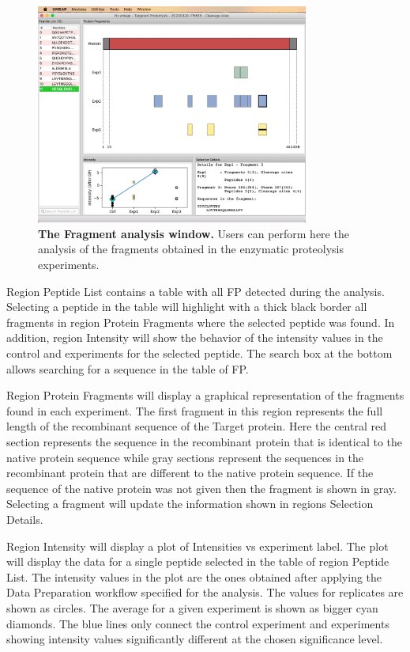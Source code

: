 \begin{figure}[h]
    \centering
    \includegraphics[width=0.8\textwidth]{./IMAGES/MOD-TARPROT/tarprot-frag.jpg}
    \caption[The Fragment analysis window]{\textbf{The Fragment analysis window.}
    Users can perform here the analysis of the fragments obtained in the enzymatic
    proteolysis experiments.}
    \label{fig:tarprotFra}
    \vspace{-5pt}
\end{figure} 

Region Peptide List contains a table with all FP detected during the analysis. Selecting
a peptide in the table will highlight with a thick black border all fragments in
region Protein Fragments where the selected peptide was found. In addition, region
Intensity will show the behavior of the intensity values in the control and experiments
for the selected peptide. The search box at the bottom allows searching for a sequence
in the table of FP.

Region Protein Fragments will display a graphical representation of the fragments
found in each experiment. The first fragment in this region represents the full length
of the recombinant sequence of the Target protein. Here the central red section represents
the sequence in the recombinant protein that is identical to the native protein sequence
while gray sections represent the sequences in the recombinant protein that are different
to the native protein sequence. If the sequence of the native protein was not given
then the fragment is shown in gray. Selecting a fragment will update the information
shown in regions Selection Details.

Region Intensity will display a plot of Intensities vs experiment label. The plot
will display the data for a single peptide selected in the table of region Peptide
List. The intensity values in the plot are the ones obtained after applying the Data
Preparation workflow specified for the analysis. The values for replicates are shown
as circles. The average for a given experiment is shown as bigger cyan diamonds.
The blue lines only connect the control experiment and experiments showing intensity
values significantly different at the chosen significance level.

